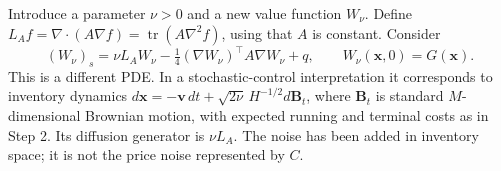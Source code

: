 \documentclass[11pt,a4paper]{article}
\begin{document}
Introduce a parameter $\nu>0$ and a new value function $W_\nu$. Define
$L_A f=\nabla\!\cdot(A\nabla f)
=\operatorname{tr}(A\nabla^2 f)$, using that $A$ is constant. Consider
\begin{equation}
 \boxed{(W_\nu)_s=\nu L_AW_\nu
 -\tfrac14(\nabla W_\nu)^\top A\nabla W_\nu+q,
 \qquad W_\nu(\mathbf x,0)=G(\mathbf x).}
 \label{eq:viscous}
\end{equation}
This is a different PDE. In a stochastic-control interpretation it
corresponds to inventory dynamics
$d\mathbf x=-\mathbf v\,dt+\sqrt{2\nu}\,H^{-1/2}d\mathbf B_t$,
where $\mathbf B_t$ is standard $M$-dimensional Brownian motion, with
expected running and terminal costs as in Step 2. Its diffusion generator
is $\nu L_A$. The noise has been added in inventory space; it is not the
price noise represented by $C$.
\end{document}
